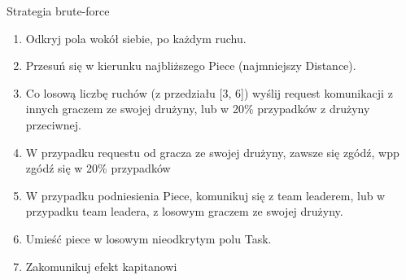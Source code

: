 \documentclass[11pt]{article}
\begin{document}
\begin{alg}[H]
\caption{Strategia brute-force}
\begin{enumerate}
\item Odkryj pola wokół siebie, po każdym ruchu.
\item Przesuń się w kierunku najbliższego Piece (najmniejszy Distance).
\item Co losową liczbę ruchów (z przedziału [3, 6]) wyślij request komunikacji z innych graczem ze swojej drużyny, lub w 20\% przypadków z drużyny przeciwnej.
\item W przypadku requestu od gracza ze swojej drużyny, zawsze się zgódź, wpp zgódź się w 20\% przypadków
\item W przypadku podniesienia Piece, komunikuj się z team leaderem, lub w przypadku team leadera, z losowym graczem ze swojej drużyny.
\item Umieść piece w losowym nieodkrytym polu Task.
\item Zakomunikuj efekt kapitanowi
\end{enumerate}
\end{alg}
\end{document}
